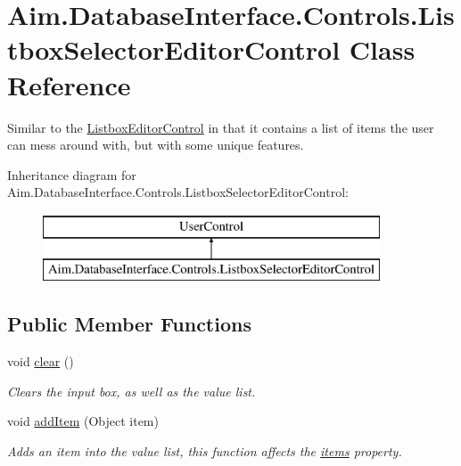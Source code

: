 \hypertarget{class_aim_1_1_database_interface_1_1_controls_1_1_listbox_selector_editor_control}{}\section{Aim.\+Database\+Interface.\+Controls.\+Listbox\+Selector\+Editor\+Control Class Reference}
\label{class_aim_1_1_database_interface_1_1_controls_1_1_listbox_selector_editor_control}


Similar to the \mbox{\hyperlink{class_aim_1_1_database_interface_1_1_controls_1_1_listbox_editor_control}{Listbox\+Editor\+Control}} in that it contains a list of items the user can mess around with, but with some unique features.  


Inheritance diagram for Aim.\+Database\+Interface.\+Controls.\+Listbox\+Selector\+Editor\+Control\+:\begin{figure}[H]
\begin{center}
\leavevmode
\includegraphics[height=2.000000cm]{class_aim_1_1_database_interface_1_1_controls_1_1_listbox_selector_editor_control}
\end{center}
\end{figure}
\subsection*{Public Member Functions}
\begin{DoxyCompactItemize}
\item 
void \mbox{\hyperlink{class_aim_1_1_database_interface_1_1_controls_1_1_listbox_selector_editor_control_ac468cf3c7fa247856fa48cca98b310e0}{clear}} ()
\begin{DoxyCompactList}\small\item\em Clears the input box, as well as the value list. \end{DoxyCompactList}\item 
void \mbox{\hyperlink{class_aim_1_1_database_interface_1_1_controls_1_1_listbox_selector_editor_control_a7508972e6d21cd31a8b892e26a26dab1}{add\+Item}} (Object item)
\begin{DoxyCompactList}\small\item\em Adds an item into the value list, this function affects the \mbox{\hyperlink{class_aim_1_1_database_interface_1_1_controls_1_1_listbox_selector_editor_control_ad1de3dde9f4b18186482336335f7efc2}{items}} property. \end{DoxyCompactList}\end{DoxyCompactItemize}
